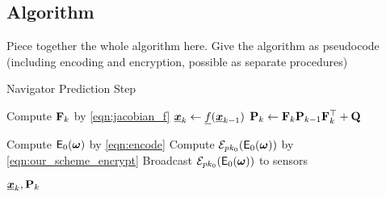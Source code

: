 \documentclass[twocolumn]{autart}
\begin{document}
% 
% 

\subsection{Algorithm}
Piece together the whole algorithm here.
Give the algorithm as pseudocode (including encoding and encryption, possible as separate procedures)


\begin{algorithm}
    \caption{Navigator Prediction Step}\label{alg:nav_prediction}
    \begin{algorithmic}[1]

        \State Compute ${{\mathbf{F}}}_k$ by \eqref{eqn:jacobian_f}
        \State ${\boldsymbol{\underline{x}}}_{k} \gets {\underline{f}}({\boldsymbol{\underline{x}}}_{k-1})$
        \State ${{\mathbf{P}}}_{k} \gets {\ensuremath{{\mathbf{F}}}}_k{{\mathbf{P}}}_{k-1}{{\mathbf{F}}}_k^\top + {{\mathbf{Q}}}$

            \State Compute $\mathsf{E}_{0}({\boldsymbol{\omega}})$ by \eqref{eqn:encode}
            \State Compute $\mathcal{E}_{pk_0}(\mathsf{E}_{0}({\boldsymbol{\omega}}))$ by \eqref{eqn:our_scheme_encrypt}
            \State Broadcast $\mathcal{E}_{pk_0}(\mathsf{E}_{0}({\boldsymbol{\omega}}))$ to sensors
        \EndFor

        \State \Return ${\boldsymbol{\underline{x}}}_{k}, {{\mathbf{P}}}_{k}$
        \EndProcedure
    \end{algorithmic}
\end{algorithm}
\end{document}
